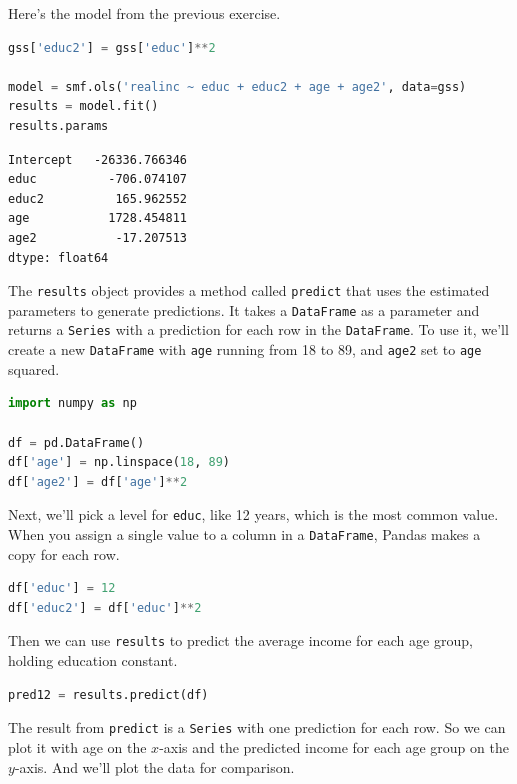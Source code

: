 Here's the model from the previous exercise.

\begin{lstlisting}[language=Python,style=source]
gss['educ2'] = gss['educ']**2

model = smf.ols('realinc ~ educ + educ2 + age + age2', data=gss)
results = model.fit()
results.params
\end{lstlisting}

\begin{lstlisting}[style=output]
Intercept   -26336.766346
educ          -706.074107
educ2          165.962552
age           1728.454811
age2           -17.207513
dtype: float64
\end{lstlisting}

The \passthrough{\lstinline!results!} object provides a method called
\passthrough{\lstinline!predict!} that uses the estimated parameters to
generate predictions. It takes a \passthrough{\lstinline!DataFrame!} as
a parameter and returns a \passthrough{\lstinline!Series!} with a
prediction for each row in the \passthrough{\lstinline!DataFrame!}. To
use it, we'll create a new \passthrough{\lstinline!DataFrame!} with
\passthrough{\lstinline!age!} running from 18 to 89, and
\passthrough{\lstinline!age2!} set to \passthrough{\lstinline!age!}
squared.

\begin{lstlisting}[language=Python,style=source]
import numpy as np

df = pd.DataFrame()
df['age'] = np.linspace(18, 89)
df['age2'] = df['age']**2
\end{lstlisting}

Next, we'll pick a level for \passthrough{\lstinline!educ!}, like 12
years, which is the most common value. When you assign a single value to
a column in a \passthrough{\lstinline!DataFrame!}, Pandas makes a copy
for each row.

\begin{lstlisting}[language=Python,style=source]
df['educ'] = 12
df['educ2'] = df['educ']**2
\end{lstlisting}

Then we can use \passthrough{\lstinline!results!} to predict the average
income for each age group, holding education constant.

\begin{lstlisting}[language=Python,style=source]
pred12 = results.predict(df)
\end{lstlisting}

The result from \passthrough{\lstinline!predict!} is a
\passthrough{\lstinline!Series!} with one prediction for each row. So we
can plot it with age on the \(x\)-axis and the predicted income for each
age group on the \(y\)-axis. And we'll plot the data for comparison.

